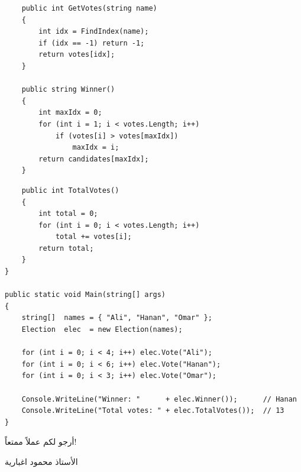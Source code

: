 \documentclass[14pt]{extarticle}
\begin{document}
\begin{enumerate}
{\begin{boxSolution}
\begin{english}
\begin{verbatim}
    public int GetVotes(string name)
    {
        int idx = FindIndex(name);
        if (idx == -1) return -1;
        return votes[idx];
    }

    public string Winner()
    {
        int maxIdx = 0;
        for (int i = 1; i < votes.Length; i++)
            if (votes[i] > votes[maxIdx])
                maxIdx = i;
        return candidates[maxIdx];
    }
\end{verbatim}
\end{english}
\end{boxSolution}
\begin{boxSolution}
\begin{english}
\begin{verbatim}
    public int TotalVotes()
    {
        int total = 0;
        for (int i = 0; i < votes.Length; i++)
            total += votes[i];
        return total;
    }
}

public static void Main(string[] args)
{
    string[]  names = { "Ali", "Hanan", "Omar" };
    Election  elec  = new Election(names);

    for (int i = 0; i < 4; i++) elec.Vote("Ali");
    for (int i = 0; i < 6; i++) elec.Vote("Hanan");
    for (int i = 0; i < 3; i++) elec.Vote("Omar");

    Console.WriteLine("Winner: "      + elec.Winner());      // Hanan
    Console.WriteLine("Total votes: " + elec.TotalVotes());  // 13
}
\end{verbatim}
\end{english}
\end{boxSolution}
}
\fi

\end{enumerate}

\vspace{1em}
\begin{flushleft}
أرجو لكم عملاً ممتعاً!

الأستاذ محمود اغبارية
\end{flushleft}
\end{document}
